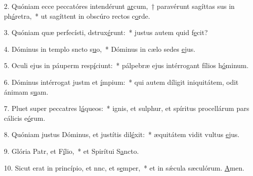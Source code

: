 2. Quóniam ecce peccatóres intendérunt \uline{ar}cum,~† paravérunt sagíttas sus in ph\uline{á}retra,~* ut sagíttent in obscúro rectos c\uline{o}rde.\par 
3. Quóniam quæ perfecísti, dstrux\uline{é}runt:~* justus autem quid f\uline{e}cit?\par 
4. Dóminus in templo sncto s\uline{u}o,~* Dóminus in cælo sedes \uline{e}jus.\par 
5. Oculi ejus in páuperm resp\uline{í}ciunt:~* pálpebræ ejus intérrogant fílios h\uline{ó}minum.\par 
6. Dóminus intérrogat justm et \uline{í}mpium:~* qui autem díligit iniquitátem, odit ánimam s\uline{u}am.\par 
7. Pluet super peccatres l\uline{á}queos:~* ignis, et sulphur, et spíritus procellárum pars cálicis e\uline{ó}rum.\par 
8. Quóniam justus Dóminus, et justítis dil\uline{é}xit:~* æquitátem vidit vultus \uline{e}jus.\par 
9. Glória Patr, et F\uline{í}lio,~* et Spirítui S\uline{a}ncto.\par 
10. Sicut erat in princípio, et nnc, et s\uline{e}mper,~* et in sǽcula sæculórum. \uline{A}men.\par 
